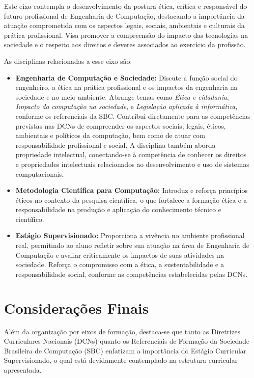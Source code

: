Este eixo contempla o desenvolvimento da postura ética, crítica e responsável do futuro profissional de Engenharia de Computação, destacando a importância da atuação comprometida com os aspectos legais, sociais, ambientais e culturais da prática profissional. Visa promover a compreensão do impacto das tecnologias na sociedade e o respeito aos direitos e deveres associados ao exercício da profissão.

As disciplinas relacionadas a esse eixo são:

\begin{itemize}
  \item \textbf{Engenharia de Computação e Sociedade:} Discute a função social do engenheiro, a ética na prática profissional e os impactos da engenharia na sociedade e no meio ambiente. Abrange temas como \textit{Ética e cidadania}, \textit{Impacto da computação na sociedade}, e \textit{Legislação aplicada à informática}, conforme os referenciais da SBC. Contribui diretamente para as competências previstas nas DCNs de compreender os aspectos sociais, legais, éticos, ambientais e políticos da computação, bem como de atuar com responsabilidade profissional e social. A disciplina também aborda propriedade intelectual, conectando-se à competência de conhecer os direitos e propriedades intelectuais relacionados ao desenvolvimento e uso de sistemas computacionais.

  \item \textbf{Metodologia Científica para Computação:} Introduz e reforça princípios éticos no contexto da pesquisa científica, o que fortalece a formação ética e a responsabilidade na produção e aplicação do conhecimento técnico e científico.

  \item \textbf{Estágio Supervisionado:} Proporciona a vivência no ambiente profissional real, permitindo ao aluno refletir sobre sua atuação na área de Engenharia de Computação e avaliar criticamente os impactos de suas atividades na sociedade. Reforça o compromisso com a ética, a sustentabilidade e a responsabilidade social, conforme as competências estabelecidas pelas DCNs.
\end{itemize}

\section*{Considerações Finais}

Além da organização por eixos de formação, destaca-se que tanto as Diretrizes Curriculares Nacionais (DCNs) quanto os Referenciais de Formação da Sociedade Brasileira de Computação (SBC) enfatizam a importância do Estágio Curricular Supervisionado, o qual está devidamente contemplado na estrutura curricular apresentada.

